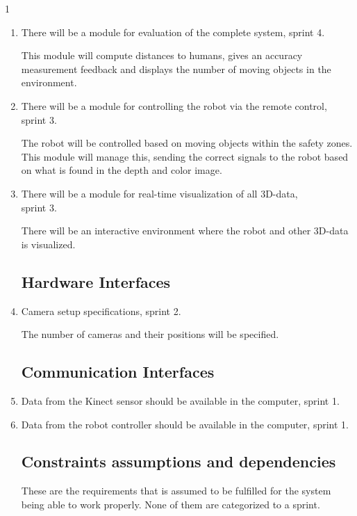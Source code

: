 1\documentclass[10pt,a4paper]{article}
\begin{document}
\begin{enumerate}
\item There will be a module for evaluation of the complete system, sprint 4.

{\addtolength{\leftskip}{5mm}This module will compute distances to humans, gives an accuracy measurement feedback and displays the number of moving objects in the environment. 
\par}

\item There will be a module for controlling the robot via the remote control, sprint 3.

{\addtolength{\leftskip}{5mm}The robot will be controlled based on moving objects within the safety zones. This module will manage this, sending the correct signals to the robot based on what is found in the depth and color image.
\par}

\item There will be a module for real-time visualization of all 3D-data,\\ sprint 3.

{\addtolength{\leftskip}{5mm}There will be an interactive environment where the robot and other 3D-data is visualized.\par}

\subsection{Hardware Interfaces}

\item Camera setup specifications, sprint 2.

{\addtolength{\leftskip}{5mm} The number of cameras and their positions will be specified.\par}

\subsection{Communication Interfaces}

\item Data from the Kinect sensor should be available in the computer, sprint 1.
\item Data from the robot controller should be available in the computer, sprint 1.

\subsection{Constraints assumptions and dependencies}
These are the requirements that is assumed to be fulfilled for the system being able to work properly. None of them are categorized to a sprint.


\end{enumerate}
\end{document}
